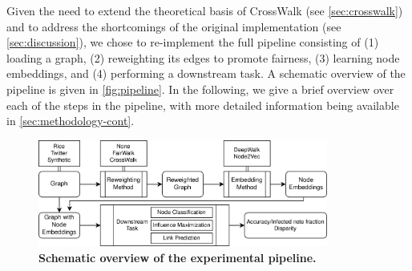 Given the need to extend the theoretical basis of CrossWalk (see \autoref{sec:crosswalk}) and to address the shortcomings of the original implementation (see \autoref{sec:discussion}), we chose to re-implement the full pipeline consisting of (1) loading a graph, (2) reweighting its edges to promote fairness, (3) learning node embeddings, and (4) performing a downstream task. A schematic overview of the pipeline is given in \autoref{fig:pipeline}. In the following, we give a brief overview over each of the steps in the pipeline, with more detailed information being available in \autoref{sec:methodology-cont}. %


\begin{figure}[!htbp]
    \centering
   \includegraphics[width=0.85\textwidth]{images/graph_pipeline-better.png}
\caption{\textbf{Schematic overview of the experimental pipeline.}}
\label{fig:pipeline}
\end{figure}


